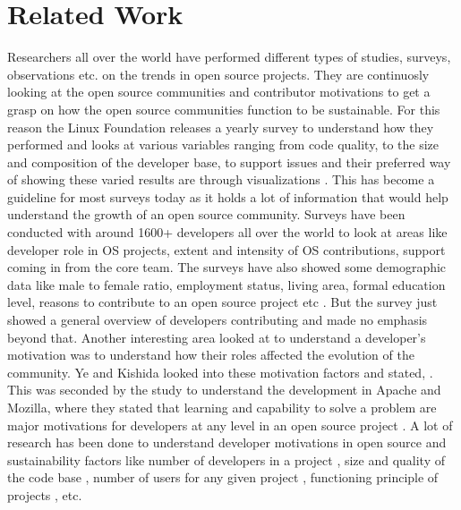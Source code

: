 \documentclass[seploa]{beavtex}
\begin{document}
\chapter{Related Work}
Researchers all over the world have performed different types of studies, surveys, observations etc. on the trends in open source projects. They are continuosly looking at the open source communities and contributor motivations to get a grasp on how the open source communities function to be sustainable. For this reason the Linux Foundation releases a yearly survey to understand how they performed
and looks at various variables ranging from code quality, to the size and composition of the developer
base, to support issues and their preferred way of showing these varied results are through visualizations \cite{lfs}. This has become a guideline for most surveys today as it holds a lot of information that would help understand the growth of an open source community. Surveys have been conducted with around 1600+ developers all over the world to look at areas like developer role in OS projects, extent and intensity of OS contributions, support coming in from the core team. The surveys have also showed some demographic data like male to female ratio, employment status, living area, formal education level, reasons to contribute to an open source project etc \cite{david2003}. But the survey just showed a general overview of developers contributing and made no emphasis beyond that. Another interesting area looked at to understand a developer's motivation was to understand how their roles affected the evolution of the community. Ye and Kishida looked into these motivation factors and stated,  \cite{kishida2003}. This was seconded by the study to understand the development in Apache and Mozilla, where they stated that learning and capability to solve a problem are major motivations for developers at any level in an open source project \cite{mockus2002}. A lot of research has been done to understand developer motivations in open source and sustainability factors like number of developers in a project \cite{david2003, rishab2002}, size and quality of the code base \cite{marc2014}, number of users for any given project \cite{rishab2002}, functioning principle of projects \cite{tarja2013}, etc.
\end{document}
